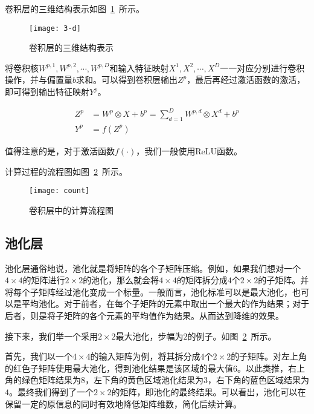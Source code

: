 卷积层的三维结构表示如图~\ref{piture:5}~所示。

\begin{figure}[h]
\centering
\texttt{[image: 3-d]}
\caption{卷积层的三维结构表示}
\label{piture:5}
\end{figure}

将卷积核$W^{p,1},W^{p,2},\cdots,W^{p,D}$和输入特征映射$X^1,X^2,\cdots,X^D$一一对应分别进行卷积操作，并与偏置量$b$求和。可以得到卷积层输出$Z^p$，最后再经过激活函数的激活，即可得到输出特征映射$Y^{p}$。

\begin{equation}
\label{eq:2}
\begin{aligned}
Z^p&=W^p\otimes X+b^p=\sum_{d=1}^{D}W^{p,d}\otimes X^d+b^p\\
Y^p&=f(Z^p)
\end{aligned}
\end{equation}

值得注意的是，对于激活函数$f(\cdot)$，我们一般使用ReLU函数。

计算过程的流程图如图~\ref{piture:6}~所示。

\begin{figure}[h]
\centering
\texttt{[image: count]}
\caption{卷积层中的计算流程图}
\label{piture:6}
\end{figure}

\subsection{池化层}

池化层通俗地说，池化就是将矩阵的各个子矩阵压缩。例如，如果我们想对一个$4\times 4$的矩阵进行$2\times 2$的池化，那么就会将$4\times 4$的矩阵拆分成$4$个$2\times 2$的子矩阵。并将每个子矩阵经过池化变成一个标量。一般而言，池化标准可以是最大池化，也可以是平均池化。对于前者，在每个子矩阵的元素中取出一个最大的作为结果；对于后者，则是将子矩阵的各个元素的平均值作为结果。从而达到降维的效果。

接下来，我们举一个采用$2\times 2$最大池化，步幅为$2$的例子。如图~\ref{piture:6}~所示。

首先，我们以一个$4\times 4$的输入矩阵为例，将其拆分成$4$个$2\times 2$的子矩阵。对左上角的红色子矩阵使用最大池化，得到池化结果是该区域的最大值$6$。以此类推，右上角的绿色矩阵结果为$8$，左下角的黄色区域池化结果为$3$，右下角的蓝色区域结果为$4$。最终我们得到了一个$2\times 2$的矩阵，即池化的最终结果。可以看出，池化可以在保留一定的原信息的同时有效地降低矩阵维数，简化后续计算。


